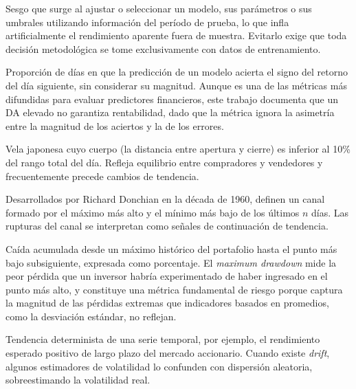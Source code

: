 \begin{description}[style=nextline, leftmargin=1.5cm]
\item[\hypertarget{glos:data_snooping}{\textit{Data snooping}}]
Sesgo que surge al ajustar o seleccionar un modelo, sus par\'ametros o sus umbrales utilizando informaci\'on del per\'iodo de prueba, lo que infla artificialmente el rendimiento aparente fuera de muestra. Evitarlo exige que toda decisi\'on metodol\'ogica se tome exclusivamente con datos de entrenamiento.

\item[\hypertarget{glos:directional_accuracy}{\textit{Directional Accuracy} (DA)}]
Proporci\'on de d\'ias en que la predicci\'on de un modelo acierta el signo del retorno del d\'ia siguiente, sin considerar su magnitud. Aunque es una de las m\'etricas m\'as difundidas para evaluar predictores financieros, este trabajo documenta que un DA elevado no garantiza rentabilidad, dado que la m\'etrica ignora la asimetr\'ia entre la magnitud de los aciertos y la de los errores.

\item[\hypertarget{glos:doji}{\textit{Doji}}]
Vela japonesa cuyo cuerpo (la distancia entre apertura y cierre) es inferior al 10\% del rango total del d\'ia. Refleja equilibrio entre compradores y vendedores y frecuentemente precede cambios de tendencia.

\item[\hypertarget{glos:donchian}{Canales de Donchian}]
Desarrollados por Richard Donchian en la d\'ecada de 1960, definen un canal formado por el m\'aximo m\'as alto y el m\'inimo m\'as bajo de los \'ultimos $n$ d\'ias. Las rupturas del canal se interpretan como se\~nales de continuaci\'on de tendencia.

\item[\hypertarget{glos:drawdown}{\textit{Drawdown}}]
Ca\'ida acumulada desde un m\'aximo hist\'orico del portafolio hasta el punto m\'as bajo subsiguiente, expresada como porcentaje. El \textit{maximum drawdown} mide la peor p\'erdida que un inversor habr\'ia experimentado de haber ingresado en el punto m\'as alto, y constituye una m\'etrica fundamental de riesgo porque captura la magnitud de las p\'erdidas extremas que indicadores basados en promedios, como la desviaci\'on est\'andar, no reflejan.

\item[\hypertarget{glos:drift}{\textit{Drift} (deriva)}]
Tendencia determinista de una serie temporal, por ejemplo, el rendimiento esperado positivo de largo plazo del mercado accionario. Cuando existe \textit{drift}, algunos estimadores de volatilidad lo confunden con dispersi\'on aleatoria, sobreestimando la volatilidad real.


\end{description}
